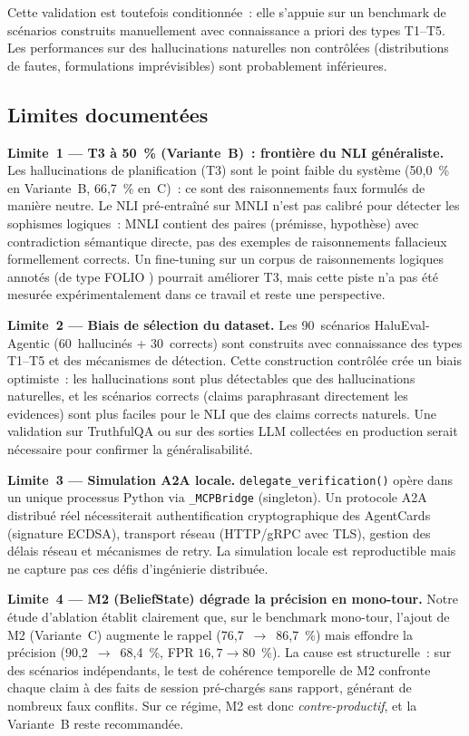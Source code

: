 \documentclass[12pt,a4paper]{article}
\begin{document}
Cette validation est toutefois conditionnée~: elle s'appuie sur un benchmark de scénarios construits manuellement avec connaissance a priori des types T1--T5. Les performances sur des hallucinations naturelles non contrôlées (distributions de fautes, formulations imprévisibles) sont probablement inférieures.

\subsection{Limites documentées}
\label{sec:limites}

\textbf{Limite~1 --- T3 à 50~\% (Variante~B)~: frontière du NLI généraliste.}
Les hallucinations de planification (T3) sont le point faible du système (50,0~\% en Variante~B, 66,7~\% en~C)~: ce sont des raisonnements faux formulés de manière neutre. Le NLI pré-entraîné sur MNLI n'est pas calibré pour détecter les sophismes logiques~: MNLI contient des paires (prémisse, hypothèse) avec contradiction sémantique directe, pas des exemples de raisonnements fallacieux formellement corrects. Un fine-tuning sur un corpus de raisonnements logiques annotés (de type FOLIO \cite{han2022folio}) pourrait améliorer T3, mais cette piste n'a pas été mesurée expérimentalement dans ce travail et reste une perspective.

\textbf{Limite~2 --- Biais de sélection du dataset.}
Les 90~scénarios HaluEval-Agentic (60~hallucinés + 30~corrects) sont construits avec connaissance des types T1--T5 et des mécanismes de détection. Cette construction contrôlée crée un biais optimiste~: les hallucinations sont plus \og{}détectables\fg{} que des hallucinations naturelles, et les scénarios corrects (claims paraphrasant directement les evidences) sont plus \og{}faciles\fg{} pour le NLI que des claims corrects naturels. Une validation sur TruthfulQA \cite{lin2022truthfulqa} ou sur des sorties LLM collectées en production serait nécessaire pour confirmer la généralisabilité.

\textbf{Limite~3 --- Simulation A2A locale.}
\texttt{delegate\_verification()} opère dans un unique processus Python via \texttt{\_MCPBridge} (singleton). Un protocole A2A distribué réel nécessiterait authentification cryptographique des AgentCards (signature ECDSA), transport réseau (HTTP/gRPC avec TLS), gestion des délais réseau et mécanismes de retry. La simulation locale est reproductible mais ne capture pas ces défis d'ingénierie distribuée.

\textbf{Limite~4 --- M2 (BeliefState) dégrade la précision en mono-tour.}
Notre étude d'ablation établit clairement que, sur le benchmark mono-tour, l'ajout de M2 (Variante~C) augmente le rappel (76,7~$\to$~86,7~\%) mais effondre la précision (90,2~$\to$~68,4~\%, FPR $16{,}7 \to 80$~\%). La cause est structurelle~: sur des scénarios indépendants, le test de cohérence temporelle de M2 confronte chaque claim à des faits de session pré-chargés sans rapport, générant de nombreux faux conflits. Sur ce régime, M2 est donc \emph{contre-productif}, et la Variante~B reste recommandée.
\end{document}
